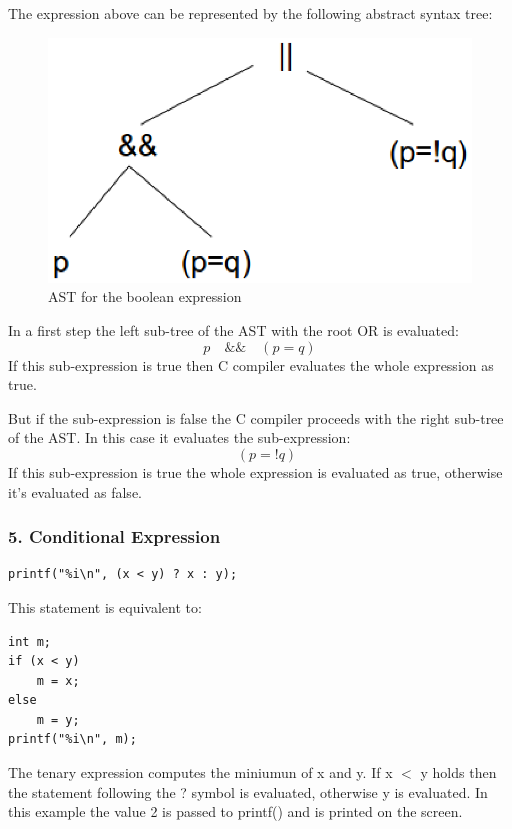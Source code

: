 \documentclass[12pt]{article}
\begin{document}
The expression above can be represented by the following abstract syntax tree:
\begin{figure}[!htb]
\centering
\includegraphics[scale=0.5]{tree.eps} 
\caption{AST for the boolean expression}
\end{figure}


In a first step the left sub-tree of the AST with the root OR is evaluated:
\begin{equation}
p \quad \&\& \quad (p=q)
\end{equation}
If this sub-expression is true then C compiler evaluates the whole expression as true.

But if the sub-expression is false the C compiler proceeds with the right sub-tree of the AST. In this case it evaluates the sub-expression:
\begin{equation}
 \quad (p = !q)
\end{equation}
If this sub-expression is true the whole expression is evaluated as true, otherwise it's evaluated as false.

\newpage
\subsubsection*{5. Conditional Expression}
\begin{lstlisting}
printf("%i\n", (x < y) ? x : y);
\end{lstlisting}
This statement is equivalent to:
\begin{lstlisting}
int m;
if (x < y)
	m = x;
else 
	m = y;
printf("%i\n", m);
\end{lstlisting}
The tenary expression computes the miniumun of x and y. If x $<$ y holds then the statement following the ? symbol is evaluated, otherwise y is evaluated. In this example the value 2 is passed to printf() and is printed on the screen.
\end{document}
